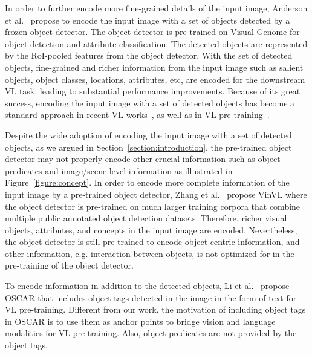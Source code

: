 \documentclass[10pt,twocolumn,letterpaper]{article}
\begin{document}
In order to further encode more fine-grained details of the input image, Anderson et al.~\cite{anderson2018bottom} propose to encode the input image with a set of objects detected by a frozen object detector.
The object detector is pre-trained on Visual Genome for object detection and attribute classification.
The detected objects are represented by the RoI-pooled features from the object detector.
With the set of detected objects, fine-grained and richer information from the input image such as salient objects, object classes, locations, attributes, etc, are encoded for the downstream VL task, leading to substantial performance improvements.
Because of its great success, encoding the input image with a set of detected objects has become a standard approach in recent VL works~\cite{anderson2018bottom,ke2019reflective,qin2019look,huang2019adaptively,wang2020show,huang2019attention,herdade2019image}, as well as in VL pre-training~\cite{chen2020uniter,tan2019lxmert,lu2019vilbert,su2019vl,li2019visualbert}.

Despite the wide adoption
of encoding the input image with a set of detected objects, as we argued in Section~\ref{section:introduction}, the pre-trained object detector may not properly encode other crucial information such as object predicates and image/scene level information as illustrated in Figure~\ref{figure:concept}.
In order to encode more complete information of the input image by a pre-trained object detector, Zhang et al.~\cite{zhang2021vinvl} propose VinVL where the object detector is pre-trained on much larger training corpora that combine multiple public annotated object detection datasets.
Therefore, richer visual objects, attributes, and concepts in the input image are encoded.
Nevertheless, the object detector is still pre-trained to encode object-centric information, and other information, e.g. interaction between objects, is not optimized for in the pre-training of the object detector.

To encode information in addition to the detected objects, Li et al.~\cite{li2020oscar} propose OSCAR that includes object tags detected in the image in the form of text for VL pre-training.
Different from our work, the motivation of including object tags in OSCAR is to use them as anchor points to bridge vision and language modalities for VL pre-training.
Also, object predicates are not provided by the object tags.
\end{document}
